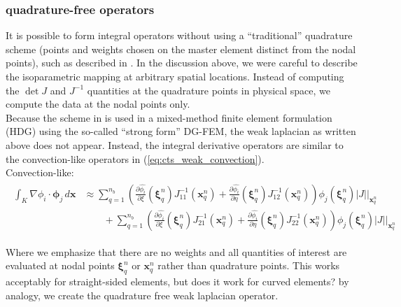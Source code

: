 \documentclass[10pt]{article}
\begin{document}
  \subsubsection{quadrature-free operators}

  It is possible to form integral operators without using a ``traditional'' quadrature scheme (points
  and weights chosen on the master element distinct from the nodal points), such as described in
  \cite{ueckermann_lermusiaux_JCP2016}. In the discussion above, we were careful to describe the
  isoparametric mapping at arbitrary spatial locations.  Instead of computing the $\det J$ and
  $J^{-1}$ quantities at the quadrature points in physical space, we compute the data at the nodal
  points only. \\

  Because the scheme in \cite{ueckermann_lermusiaux_JCP2016} is used in a mixed-method finite
  element formulation (HDG) using the so-called ``strong form'' DG-FEM, the weak laplacian as
  written above does not appear. Instead, the integral derivative operators are similar to the
  convection-like operators in (\ref{eq:cts_weak_convection}). \\

  Convection-like:
  \begin{align}
    \begin{split}
      \int_{K}^{} \nabla\phi_i\cdot \bm{\phi}_j \,d\bm{x}
    &\approx \sum_{q=1}^{n_b}
    \left( \frac{\partial \widehat{\phi_i}}{\partial \xi}(\bm{\xi}^n_q) J^{-1}_{11}(\bm{x}^n_q)
    + \frac{\partial \widehat{\phi_i}}{\partial \eta}(\bm{\xi}^n_q) J^{-1}_{12}(\bm{x}^n_q) \right)
    \phi_j(\bm{\xi}^n_q) |J|\bigg|_{\bm{x}^n_q} \\
    & \qquad + \sum_{q=1}^{n_b}
    \left( \frac{\partial \widehat{\phi_i}}{\partial \xi}(\bm{\xi}^n_q) J^{-1}_{21}(\bm{x}^n_q)
    + \frac{\partial \widehat{\phi_i}}{\partial \eta}(\bm{\xi}^n_q) J^{-1}_{22}(\bm{x}^n_q) \right)
    \phi_j(\bm{\xi}^n_q) |J|\bigg|_{\bm{x}^n_q}
    \end{split}
    \label{eq:disc_weak_laplacian_qf_mat}
  \end{align}

  Where we emphasize that there are no weights and all quantities of interest are evaluated at nodal
  points $\bm{\xi}^n_q$ or $\bm{x}^n_q$ rather than quadrature points. This works acceptably for
  straight-sided elements, but does it work for curved elements? by analogy, we create the
  quadrature free weak laplacian operator. \\
\end{document}
